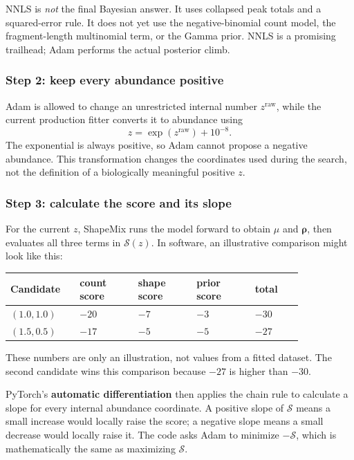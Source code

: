 \documentclass[11pt]{article}
\begin{document}
\begin{watchout}
NNLS is \emph{not} the final Bayesian answer. It uses collapsed peak totals and
a squared-error rule. It does not yet use the negative-binomial count model, the
fragment-length multinomial term, or the Gamma prior. NNLS is a promising
trailhead; Adam performs the actual posterior climb.
\end{watchout}

\subsubsection*{Step 2: keep every abundance positive}

Adam is allowed to change an unrestricted internal number
\(z^{\mathrm{raw}}\), while the current production fitter converts it to abundance
using
\[
\boxed{z=\exp\left(z^{\mathrm{raw}}\right)+10^{-8}.}
\]
The exponential is always positive, so Adam cannot propose a negative abundance.
This transformation changes the coordinates used during the search, not the
definition of a biologically meaningful positive \(z\).

\subsubsection*{Step 3: calculate the score and its slope}

For the current \(z\), ShapeMix runs the model forward to obtain \(\mu\) and
\(\boldsymbol\rho\), then evaluates all three terms in \(\mathcal S(z)\). In
software, an illustrative comparison might look like this:

\begin{center}
\begin{tabular}{C{0.19\linewidth}C{0.17\linewidth}C{0.17\linewidth}C{0.17\linewidth}C{0.14\linewidth}}
\toprule
Candidate & count score & shape score & prior score & total \\
\midrule
\((1.0,1.0)\) & \(-20\) & \(-7\) & \(-3\) & \(-30\) \\
\((1.5,0.5)\) & \(-17\) & \(-5\) & \(-5\) & \(-27\) \\
\bottomrule
\end{tabular}
\end{center}

These numbers are only an illustration, not values from a fitted dataset. The
second candidate wins this comparison because \(-27\) is higher than \(-30\).

PyTorch's \textbf{automatic differentiation} then applies the chain rule to
calculate a slope for every internal abundance coordinate. A positive slope of
\(\mathcal S\) means a small increase would locally raise the score; a negative
slope means a small decrease would locally raise it. The code asks Adam to
minimize \(-\mathcal S\), which is mathematically the same as maximizing
\(\mathcal S\).
\end{document}

